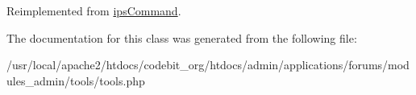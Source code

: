 Reimplemented from \hyperlink{classips_command_afbc4e912a0604b94d47d66744c64d8ba}{ips\-Command}.



The documentation for this class was generated from the following file\-:\begin{DoxyCompactItemize}
\item 
/usr/local/apache2/htdocs/codebit\-\_\-org/htdocs/admin/applications/forums/modules\-\_\-admin/tools/tools.\-php\end{DoxyCompactItemize}
